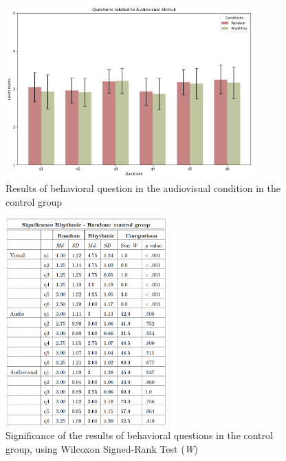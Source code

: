 \begin{figure}[H]
    \centering
    \includegraphics[width=0.85\textwidth]{bar_plots/plotbar_audiovisual_h.png}
    \caption{Results of behavioral question in the audiovisual condition in the control group}
    \label{fig: bar_audiovisual_control} 
\end{figure} 
\begin{figure}[H]
    \centering
    \includegraphics[width=0.55\textwidth]{significance_tables/control_group.png}
    \caption{Significance of the results of behavioral questions in the control group, using Wilcoxon Signed-Rank Test (\textit{W})}
    \label{fig: significance_control_pop} 
\end{figure} 

